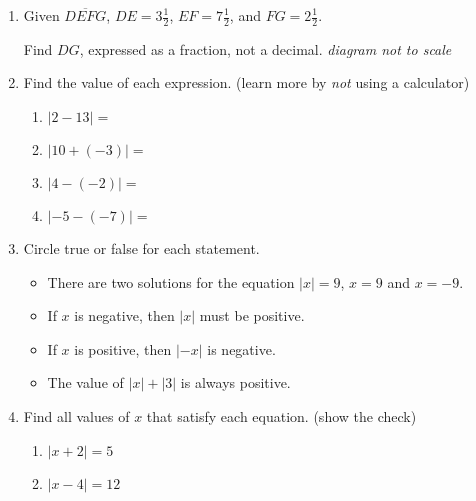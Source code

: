 \begin{enumerate}
\newpage
\item Given $\overline{DEFG}$, $DE=3 \frac{1}{2}$, $EF=7 \frac{1}{2}$, and $FG= 2 \frac{1}{2}$. \par \medskip
Find ${DG}$, expressed as a fraction, not a decimal. \hfill  \emph{diagram not to scale} \medskip
\begin{flushleft}
\end{flushleft} \vspace{2cm}

\item Find the value of each expression. (learn more by \emph{not} using a calculator)
  \begin{multicols}{2}
    \begin{enumerate}[itemsep=1cm]
      \item $|2-13|=$
      \item $|10+(-3)|=$
      \item $|4-(-2)|=$
      \item $|-5-(-7)|=$
    \end{enumerate}
  \end{multicols} \bigskip

\item Circle true or false for each statement. \bigskip
  \begin{itemize}[label={\textbf{T \; F \;}}, itemsep=0.5cm]
    \item There are two solutions for the equation $|x|=9$, $x=9$ and $x=-9$.
    \item If $x$ is negative, then $|x|$ must be positive.
    \item If $x$ is positive, then $|-x|$ is negative.
    \item The value of $|x|+|3|$ is always positive.
  \end{itemize} \bigskip

\item Find all values of $x$ that satisfy each equation. (show the check) \bigskip
  \begin{multicols}{2} 
    \begin{enumerate}
      \item $|x+2|=5$
      \item $|x-4|=12$
    \end{enumerate}
  \end{multicols}


\end{enumerate}
